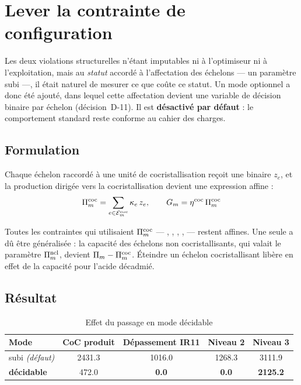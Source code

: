 \section{Lever la contrainte de configuration}
\label{sec:mode-decidable}

Les deux violations structurelles n'étant imputables ni à l'optimiseur ni à l'exploitation,
mais au \emph{statut} accordé à l'affectation des échelons --- un paramètre subi ---, il
était naturel de mesurer ce que coûte ce statut. Un mode optionnel a donc été ajouté, dans
lequel cette affectation devient une variable de décision binaire par échelon
(décision~D-11). Il est \textbf{désactivé par défaut} : le comportement standard reste
conforme au cahier des charges.

\subsection{Formulation}

Chaque échelon raccordé à une unité de cocristallisation reçoit une binaire $z_e$, et la
production dirigée vers la cocristallisation devient une expression affine :
\begin{equation}
\Pi^{\mathrm{coc}}_m = \sum_{e \in \mathcal{E}^{\mathrm{coc}}_m} \kappa_e\, z_e,
\qquad G_m = \eta^{\mathrm{coc}}\, \Pi^{\mathrm{coc}}_m
\label{eq:coc-decidable}
\end{equation}

Toutes les contraintes qui utilisaient $\Pi^{\mathrm{coc}}_m$ --- , , , ,
 --- restent affines. Une seule a dû être généralisée : la capacité des échelons non
cocristallisants, qui valait le paramètre $\Pi^{\mathrm{ncl}}_m$, devient $\Pi_m - \Pi^{\mathrm{coc}}_m$. Éteindre
un échelon cocristallisant libère en effet de la capacité pour l'acide décadmié.

\subsection{Résultat}

\begin{table}[H]
\centering
\caption{Effet du passage en mode décidable}
\label{tab:mode-decidable}
\begin{tabular}{@{}lS[table-format=4.1]S[table-format=4.1]S[table-format=4.1]S[table-format=4.1]@{}}
\toprule
\textbf{Mode} & {\textbf{CoC produit}} & {\textbf{Dépassement IR11}} & {\textbf{Niveau 2}} & {\textbf{Niveau 3}} \\
\midrule
subi \emph{(défaut)} & 2431.3 & 1016.0 & 1268.3 & 3111.9 \\
\textbf{décidable} & 472.0 & \bfseries 0.0 & \bfseries 0.0 & \bfseries 2125.2 \\
\bottomrule
\end{tabular}
\end{table}

